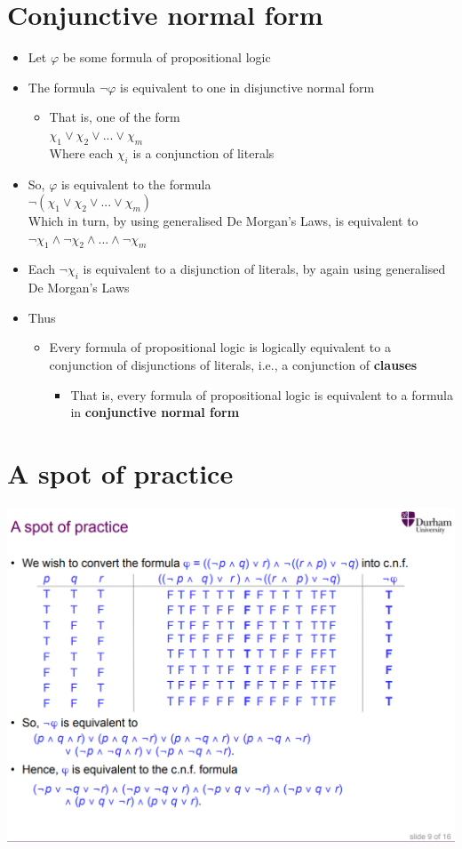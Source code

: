 \documentclass{article}[18pt]
\begin{document}
\section{Conjunctive normal form}
\begin{itemize}
\item Let $\varphi$ be some formula of propositional logic
\item The formula $\lnot \varphi$ is equivalent to one in disjunctive normal form
\begin{itemize}
\item That is, one of the form\\
$\chi_1\lor\chi_2\lor ... \lor \chi_m$\\
Where each $\chi_i$ is a conjunction of literals
\end{itemize}

\item So, $\varphi$ is equivalent to the formula\\
$\lnot(\chi_1\lor\chi_2\lor ... \lor \chi_m)$\\
Which in turn, by using generalised De Morgan's Laws, is equivalent to\\
$\lnot \chi_1\land \lnot \chi_2\land ... \land \lnot \chi_m$

\item Each $\lnot\chi_i$ is equivalent to a disjunction of literals, by again using generalised De Morgan's Laws

\item Thus
\begin{itemize}
\item Every formula of propositional logic is logically equivalent to a conjunction of disjunctions of literals, i.e., a conjunction of \textbf{clauses}
\begin{itemize}
\item That is, every formula of propositional logic is equivalent to a formula in \textbf{conjunctive normal form}
\end{itemize}
\end{itemize}
\end{itemize}
\section{A spot of practice}
\includegraphics[width=\textwidth]{Fig2.png}
\end{document}
